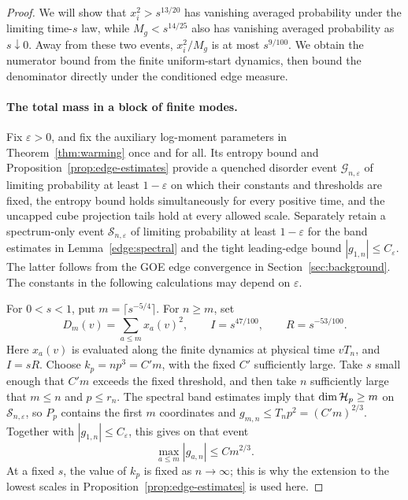 \begin{proof}
We will show that \(x_i^2>s^{13/20}\) has vanishing averaged probability
under the limiting time-\(s\) law, while \(M_g<s^{14/25}\) also has
vanishing averaged probability as \(s\downarrow0\).  Away from these
two events, \(x_i^2/M_g\) is at most \(s^{9/100}\).
We obtain the numerator bound from
the finite uniform-start dynamics, then bound the denominator directly
under the conditioned edge measure.

\paragraph{The total mass in a block of finite modes.}
Fix \(\varepsilon>0\), and fix the auxiliary log-moment parameters
in Theorem~\ref{thm:warming} once and for all.  Its entropy bound and
Proposition~\ref{prop:edge-estimates} provide a quenched disorder event
\(\mathcal G_{n,\varepsilon}\) of limiting
probability at least \(1-\varepsilon\) on which their constants and
thresholds are fixed, the entropy bound holds simultaneously for
every positive time, and the uncapped cube projection tails hold at
every allowed scale.  Separately retain a spectrum-only event
\(\mathcal S_{n,\varepsilon}\) of
limiting probability at least \(1-\varepsilon\) for the band estimates
in Lemma~\ref{edge:spectral} and the tight leading-edge
bound \(|g_{1,n}|\le C_\varepsilon\).  The latter follows from the
GOE edge convergence in Section~\ref{sec:background}.  The constants in the
following calculations may depend on \(\varepsilon\).

For \(0<s<1\), put \(m=\lceil s^{-5/4}\rceil\).  For \(n\ge m\), set
\begin{equation}
 D_m(v)=\sum_{a\le m}x_a(v)^2,\qquad
 I=s^{47/100},\qquad R=s^{-53/100}.
 \label{glim:rotation-scales}
\end{equation}
Here \(x_a(v)\) is evaluated along the finite dynamics at physical
time \(vT_n\), and \(I=sR\).  Choose \(k_p=np^3=C' m\), with the
fixed \(C'\) sufficiently large.  Take \(s\) small enough that
\(C'm\) exceeds the fixed threshold, and then take \(n\) sufficiently
large that \(m\le n\) and \(p\le r_n\).  The spectral band estimates imply
that \(\dim\mathcal H_p\ge m\) on \(\mathcal S_{n,\varepsilon}\), so \(P_p\)
contains the first \(m\) coordinates and
\(g_{m,n}\le T_np^2=(C'm)^{2/3}\).  Together with
\(|g_{1,n}|\le C_\varepsilon\), this gives on that event
\begin{equation}
 \max_{a\le m}|g_{a,n}|\le C m^{2/3}.
 \label{glim:finite-head-spectrum}
\end{equation}
At a fixed \(s\), the value
of \(k_p\) is fixed as \(n\to\infty\); this is why the extension to
the lowest scales in Proposition~\ref{prop:edge-estimates} is used here.


\end{proof}
